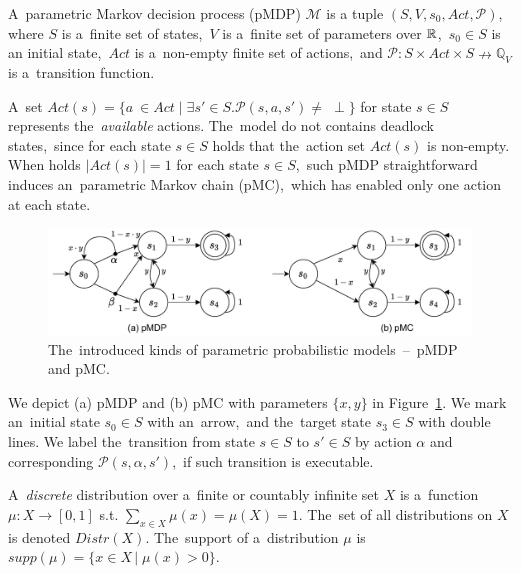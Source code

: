 \begin{definition}[pMDP]
A~parametric Markov decision process (pMDP) $\mathcal{M}$ is a tuple $(S, V, s_0, Act, \mathcal{P})$, where $S$ is a~finite set of states,~$V$ is a~finite set of parameters over $\mathbb{R}$,~$s_0 \in S$ is an initial state,~$Act$ is a~non-empty finite set of actions,~and $\mathcal{P}: S \times Act  \times S \nrightarrow \mathbb{Q}_V$ is a~transition function.
\end{definition}
\noindent
A~set $\mathit{Act(s) = \{ a~\in Act \; \lvert \; \exists s' \in S. \mathcal{P}(s, a, s') \neq \; \perp \}}$ for state $s \in S$ represents the~\textit{available} actions.
The~model do not contains deadlock states,~since for each state $s \in S$ holds that the~action set $Act(s)$ is non-empty.
When holds $\lvert \mathit{Act(s)} \rvert = 1$ for each state $s \in S$,~such pMDP straightforward induces an~parametric Markov chain (pMC),~which has enabled only one action at each state.

\begin{figure}[h!]
\centering
\includegraphics[width=1.0\textwidth]{figures/param_models.pdf}
\caption{The~introduced kinds of parametric probabilistic models \,--\, pMDP and pMC.}%
\label{fig:param_models}%
\end{figure}

\begin{example}
We depict (a) pMDP and (b) pMC with parameters $\{x, y\}$ in Figure~\ref{fig:param_models}.
We mark an~initial state $s_0 \in S$  with an~arrow,~and the~target state $s_3 \in S$ with double lines.
We label the~transition from state $s \in S$ to $s' \in S$ by action $\alpha$ and corresponding $\mathcal{P}(s, \alpha, s')$,~if such transition is executable.
\end{example}

\begin{definition}[Distribution]
\cite{tacas21} 
    A~\textit{discrete} distribution over a~finite or countably infinite set $X$ is a~function $\mu: X \rightarrow [0,1]$ s.t. $\sum_{x \in X} \mu(x) = \mu(X) = 1$.
    The~set of all distributions on $X$ is denoted $Distr(X)$.
    The~support of a~distribution $\mu$ is $supp(\mu) = \{ x \in X \, \lvert \; \mu(x) > 0 \}$.
\end{definition}

